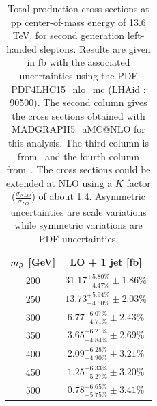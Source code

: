 \documentclass{cernatlasnote}
\begin{document}
\begin{table}
    \centering
    \begin{tabular}{ | c || c |}
        \hline
        \rowcolor{lightgray} 
         $m_{\Tilde{\mu}}$ [GeV]  & LO + 1 jet [fb] \\
         \hline
         \hline
         200 & $31.17^{+5.80\%}_{-4.47\%} \pm 1.86\%$  \\
         \hline
         250  & $13.73^{+5.94\%}_{-4.60\%} \pm 2.03\% $   \\
         \hline
         300  & $6.77^{+6.07\%}_{-4.71\%} \pm 2.43\%$ \\
         \hline
         350  & $3.65^{+6.21\%}_{-4.84\%} \pm 2.69\%$ \\
         \hline
         400   & $2.09^{+6.28\%}_{-4.90\%} \pm 3.21\%$ \\
         \hline
         450   & $1.25^{+6.33\%}_{-5.27\%} \pm 3.20\%$  \\
         \hline
         500  & $0.78^{+6.65\%}_{-5.75\%} \pm 3.41\%$  \\
         \hline
    \end{tabular}
    \caption{Total production cross sections at pp center-of-mass  energy of 13.6 TeV, for second generation left-handed sleptons. Results are given in fb with the associated uncertainties using the PDF PDF4LHC15\_nlo\_mc (LHAid : 90500). The second column gives the cross sections obtained with MADGRAPH5\_aMC@NLO for this analysis. The third column is from~\cite{Fuks_2014} and the fourth column from~\cite{Fiaschi_2018}. The cross sections could be extended at NLO using a $K$ factor ($\frac{\sigma_{NLO}}{\sigma_{LO}}$) of about 1.4. Asymmetric uncertainties are scale variations while symmetric variations are PDF uncertainties.} 
    \label{tab:LEFTXS13p6}
\end{table}
\end{document}
